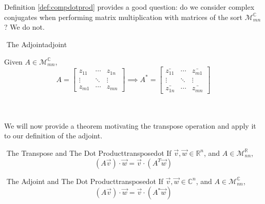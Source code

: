         \vphantom
        \\
        \\
        Definition \ref{def:compdotprod} provides a good question: do we consider complex conjugates when performing matrix multiplication with matrices of the sort \(\mathcal{M}_{mn}^\mathbb{C}\)? We do not.
        \begin{definition}{\Stop\,\,The Adjoint}{adjoint}

            Given \(A\in\mathcal{M}_{mn}^\mathbb{C}\), 
            \begin{equation*}
                A=\begin{bmatrix}
                    z_{11} & \cdots & z_{1n} \\
                    \vdots & \ddots & \vdots \\
                    z_{m1} & \cdots & z_{mn}
                \end{bmatrix}
                \implies 
                A^*=\begin{bmatrix}
                    \bar{z_{11}} & \cdots & \bar{z_{m1}} \\
                    \vdots & \ddots & \vdots \\
                    \bar{z_{1n}} & \cdots & \bar{z_{mn}}
                \end{bmatrix}
            \end{equation*}

        \end{definition}
        \vphantom
        \\
        \\
        We will now provide a theorem motivating the transpose operation and apply it to our definition of the adjoint.
        \begin{theorem}{\Stop\,\,The Transpose and The Dot Product}{transposedot}
            If \(\vec{v},\vec{w}\in\mathbb{R}^n\), and \(A\in\mathcal{M}_{nn}^\mathbb{R}\), 
            \begin{equation*}
                (A\vec{v})\cdot\vec{w}=\vec{v}\cdot(A^T\vec{w})
            \end{equation*}
        \end{theorem}
        \begin{theorem}{\Stop\,\,The Adjoint and The Dot Product}{transposedot}
            If \(\vec{v},\vec{w}\in\mathbb{C}^n\), and \(A\in\mathcal{M}_{nn}^\mathbb{C}\), 
            \begin{equation*}
                (A\vec{v})\cdot\vec{w}=\vec{v}\cdot(A^*\vec{w})
            \end{equation*}
        \end{theorem}
